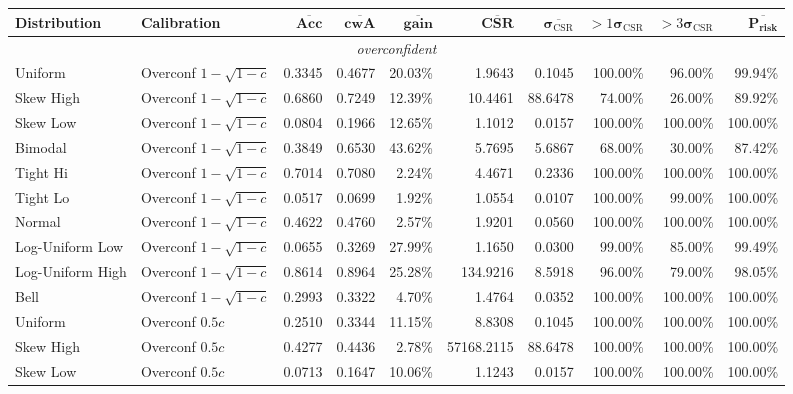 \documentclass{article}
\theoremstyle{plain}
\theoremstyle{definition}
\theoremstyle{remark}
\begin{document}
\begin{table}[ht]
\centering
\tiny
\begin{tabular}{llrrrrrrrr}
\toprule
\textbf{Distribution} & \textbf{Calibration} & $\overline{\textbf{Acc}}$ & $\overline{\textbf{cwA}}$ & $\overline{\textbf{gain}}$ & $\overline{\textbf{CSR}}$ & $\overline{\boldsymbol{\sigma}_{\mathrm{CSR}}}$ & $>1\boldsymbol{\sigma}_{\mathrm{CSR}}$ &  $>3\boldsymbol{\sigma}_{\mathrm{CSR}}$ & $\overline{\textbf{P}_{\textbf{risk}}}$ \\
\midrule
\multicolumn{10}{c}{\textit{overconfident}} \\
\midrule
Uniform & Overconf $1 - \sqrt{1 - c}$ & 0.3345 & 0.4677 & 20.03\% & 1.9643 & 0.1045 & 100.00\% & 96.00\% & 99.94\% \\
Skew High & Overconf $1 - \sqrt{1 - c}$ & 0.6860 & 0.7249 & 12.39\% & 10.4461 & 88.6478 & 74.00\% & 26.00\% & 89.92\% \\
Skew Low & Overconf $1 - \sqrt{1 - c}$ & 0.0804 & 0.1966 & 12.65\% & 1.1012 & 0.0157 & 100.00\% & 100.00\% & 100.00\% \\
Bimodal & Overconf $1 - \sqrt{1 - c}$ & 0.3849 & 0.6530 & 43.62\% & 5.7695 & 5.6867 & 68.00\% & 30.00\% & 87.42\% \\
Tight Hi & Overconf $1 - \sqrt{1 - c}$ & 0.7014 & 0.7080 & 2.24\% & 4.4671 & 0.2336 & 100.00\% & 100.00\% & 100.00\% \\
Tight Lo & Overconf $1 - \sqrt{1 - c}$ & 0.0517 & 0.0699 & 1.92\% & 1.0554 & 0.0107 & 100.00\% & 99.00\% & 100.00\% \\
Normal & Overconf $1 - \sqrt{1 - c}$ & 0.4622 & 0.4760 & 2.57\% & 1.9201 & 0.0560 & 100.00\% & 100.00\% & 100.00\% \\
Log-Uniform Low & Overconf $1 - \sqrt{1 - c}$ & 0.0655 & 0.3269 & 27.99\% & 1.1650 & 0.0300 & 99.00\% & 85.00\% & 99.49\% \\
Log-Uniform High & Overconf $1 - \sqrt{1 - c}$ & 0.8614 & 0.8964 & 25.28\% & 134.9216 & 8.5918 & 96.00\% & 79.00\% & 98.05\% \\
Bell & Overconf $1 - \sqrt{1 - c}$ & 0.2993 & 0.3322 & 4.70\% & 1.4764 & 0.0352 & 100.00\% & 100.00\% & 100.00\% \\
Uniform & Overconf $0.5c$ & 0.2510 & 0.3344 & 11.15\% & 8.8308 & 0.1045 & 100.00\% & 100.00\% & 100.00\% \\
Skew High & Overconf $0.5c$ & 0.4277 & 0.4436 & 2.78\% & 57168.2115 & 88.6478 & 100.00\% & 100.00\% & 100.00\% \\
Skew Low & Overconf $0.5c$ & 0.0713 & 0.1647 & 10.06\% & 1.1243 & 0.0157 & 100.00\% & 100.00\% & 100.00\% \\

\end{tabular}
\end{table}
\end{document}
